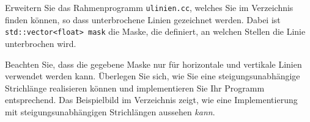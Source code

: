 %  
Erweitern Sie das Rahmenprogramm \texttt{ulinien.cc}, welches Sie im 
Verzeichnis  finden können, so 
dass unterbrochene Linien gezeichnet werden. Dabei ist 
\texttt{std::vector<float> mask} die Maske, die definiert, an welchen 
Stellen die Linie unterbrochen wird.

Beachten Sie, dass die gegebene Maske nur für horizontale und vertikale 
Linien verwendet werden kann. Überlegen Sie sich, wie Sie eine 
steigungsunabhängige Strichlänge realisieren können und implementieren 
Sie Ihr Programm entsprechend. Das Beispielbild im Verzeichnis
 zeigt, wie 
eine Implementierung mit steigungsunabhängigen Strichlängen aussehen 
\emph{kann}.

